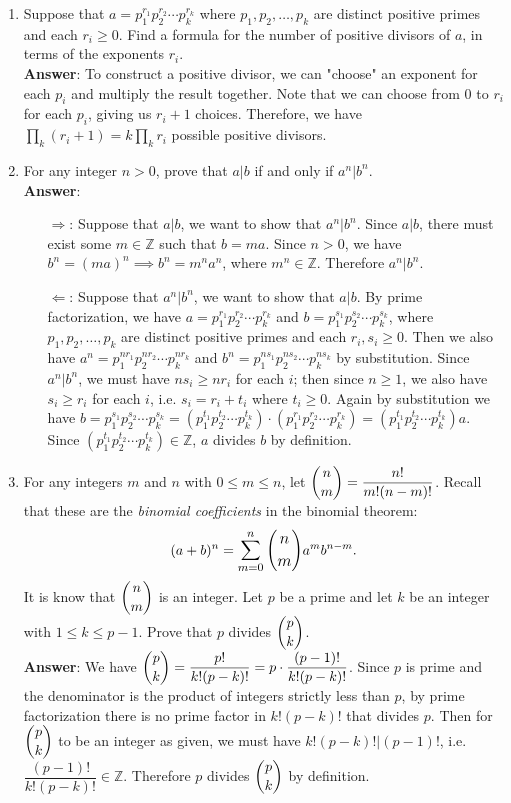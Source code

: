 \documentclass{article}
\begin{document}
\begin{enumerate}
\begin{itemize}
            \end{itemize}
      \item Suppose that $a=p_1^{r_1}p_2^{r_2}\cdots p_k^{r_k}$ where $p_1,p_2,\ldots,p_k$ are distinct positive primes and each $r_i\geq 0$. Find a formula for the number of positive divisors of $a$, in terms of the exponents $r_i$.\\
            \textbf{Answer}: To construct a positive divisor, we can "choose" an exponent for each $p_i$ and multiply the result together. Note that we can choose from 0 to $r_i$ for each $p_i$, giving us $r_i+1$ choices. Therefore, we have $\prod_k (r_i+1)=k\prod_k r_i$ possible positive divisors.
      \item For any integer $n>0$, prove that $a|b$ if and only if $a^n|b^n$.\\
            \textbf{Answer}:
            \begin{itemize}
                  \item [$\Rightarrow$:] Suppose that $a|b$, we want to show that $a^n|b^n$. Since $a|b$, there must exist some $m\in\mathbb{Z}$ such that $b=ma$. Since $n>0$, we have $b^n=(ma)^n\implies b^n=m^na^n$, where $m^n\in\mathbb{Z}$. Therefore $a^n|b^n$.
                  \item [$\Leftarrow$:] Suppose that $a^n|b^n$, we want to show that $a|b$. By prime factorization, we have $a=p_1^{r_1}p_2^{r_2}\cdots p_k^{r_k}$ and $b=p_1^{s_1}p_2^{s_2}\cdots p_k^{s_k}$, where $p_1,p_2,\ldots,p_k$ are distinct positive primes and each $r_i,s_i\geq 0$. Then we also have $a^n=p_1^{nr_1}p_2^{nr_2}\cdots p_k^{nr_k}$ and $b^n=p_1^{ns_1}p_2^{ns_2}\cdots p_k^{ns_k}$ by substitution. Since $a^n|b^n$, we must have $ns_i\geq nr_i$ for each $i$; then since $n\geq 1$, we also have $s_i\geq r_i$ for each $i$, i.e. $s_i=r_i+t_i$ where $t_i\geq 0$. Again by substitution we have $b=p_1^{s_1}p_2^{s_2}\cdots p_k^{s_k}=(p_1^{t_1}p_2^{t_2}\cdots p_k^{t_k})\cdot(p_1^{r_1}p_2^{r_2}\cdots p_k^{r_k})=(p_1^{t_1}p_2^{t_2}\cdots p_k^{t_k})a$. Since $(p_1^{t_1}p_2^{t_2}\cdots p_k^{t_k})\in\mathbb{Z}$, $a$ divides $b$ by definition.
            \end{itemize}
      \item For any integers $m$ and $n$ with $0\leq m\leq n$, let $\mathlarger{\binom{n}{m}=\frac{n!}{m!(n-m)!}}$. Recall that these are the \textit{binomial coefficients} in the binomial theorem: \[(a+b)^n=\mathlarger{\sum_{m=0}^n\binom{n}{m}}a^mb^{n-m}.\] It is know that $\mathlarger{\binom{n}{m}}$ is an integer. Let $p$ be a prime and let $k$ be an integer with $1\leq k\leq p-1$. Prove that $p$ divides $\mathlarger{\binom{p}{k}}$.\\
            \textbf{Answer}: We have $\mathlarger{\binom{p}{k}}=\dfrac{p!}{k!(p-k)!}=p\cdot\dfrac{(p-1)!}{k!(p-k)!}$. Since $p$ is prime and the denominator is the product of integers strictly less than $p$, by prime factorization there is no prime factor in $k!(p-k)!$ that divides $p$. Then for $\mathlarger{\binom{p}{k}}$ to be an integer as given, we must have $k!(p-k)!|(p-1)!$, i.e. $\dfrac{(p-1)!}{k!(p-k)!}\in\mathbb{Z}$. Therefore $p$ divides $\mathlarger{\binom{p}{k}}$ by definition.
\end{enumerate}
\end{document}
